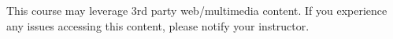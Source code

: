 This course may leverage 3rd party web/multimedia content. If you experience any
issues accessing this content, please notify your instructor.
